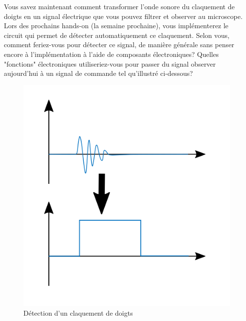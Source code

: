 
Vous savez maintenant comment transformer l'onde sonore du claquement de doigts en un signal électrique que vous pouvez filtrer et observer au microscope. Lors des prochains hands-on (la semaine prochaine), vous implémenterez le circuit qui permet de détecter automatiquement ce claquement. Selon vous, comment feriez-vous pour détecter ce signal, de manière générale sans penser encore à l'implémentation à l'aide de composants électroniques? Quelles "fonctions" électroniques utiliseriez-vous pour passer du signal observer aujourd'hui à un signal de commande tel qu'illustré ci-dessous?

\begin{figure}[!ht]
	\centering
	\includegraphics[width=.6\textwidth]{figures/signals.PNG}
	\caption{Détection d'un claquement de doigts}
	\label{fig:signals}
\end{figure}